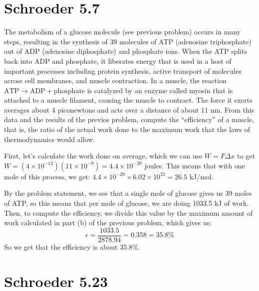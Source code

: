 \documentclass[10pt]{article}
\begin{document}
	\section*{Schroeder 5.7}
	The metabolism of a glucose molecule (see previous problem) occurs in many steps, resulting in the 
	synthesis of 39 molecules of ATP (adenosine triphosphate) out of ADP (adenosine diphosphate) and 
	phosphate ions. When the ATP splits back into ADP and phosphate, it liberates energy that is used in 
	a host of important processes including protein synthesis, active transport of molecules across cell 
	membranes, and muscle contraction. In a muscle, the reaction $\text{ATP} \to \text{ADP} + \text{phosphate}$
	is catalyzed by an enzyme called myosin that is attached to a muscle filament, causing the muscle to 
	contract. The force it exerts averages about 4 piconewtons and acts over a distance of about 11 nm. From 
	this data and the results of the previos problem, compute the ``efficiency'' of a muscle, that is, the 
	ratio of the actual work done to the maximum work that the laws of thermodynamics would allow. 

	\begin{solution}
		First, let's calculate the work done on average, which we can use $W = F \Delta x$ to get 
		$W = (4 \times 10^{-12})( 11 \times 10^{-9}) = 4.4 \times 10^{-20}$ joules. This means that 
		with one mole of this process, we get: $4.4 \times 10^{-20} \times 6.02 \times 10^{23} =  26.5$ kJ/mol. 

		By the problem statement, we see that a single mole of glucose gives us 39 moles of ATP, so 
		this means that per mole of glucose, we are doing 1033.5 kJ of work. Then, to compute the 
		efficiency, we divide this value by the maximum amount of work calculated in part (b) of the previous 
		problem, which gives us:
		\[
		\epsilon = \frac{1033.5}{2878.94} = 0.358 = 35.8 \%
		\] 
		So we get that the efficiency is about 35.8\%. 
	\end{solution}
	\pagebreak

	\section*{Schroeder 5.23}
\end{document}
